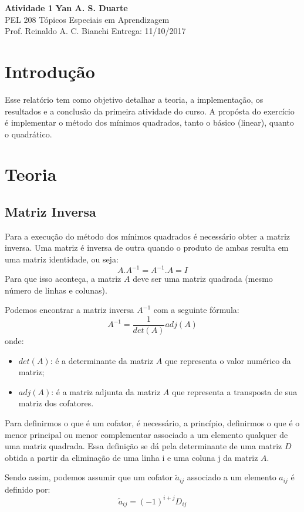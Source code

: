 \documentclass[a4paper, 11pt]{article}
\begin{document}
\noindent
\large\textbf{Atividade 1} \hfill \textbf{Yan A. S. Duarte} \\
\normalsize PEL 208 \hfill Tópicos Especiais em Aprendizagem \\
Prof. Reinaldo A. C. Bianchi \hfill Entrega: 11/10/2017 \\


\section*{Introdução}

Esse relatório tem como objetivo detalhar a teoria, a implementação, os resultados e a conclusão da primeira atividade do curso. A propósta do exercício é implementar o método dos mínimos quadrados, tanto o básico (linear), quanto o quadrático.

\section*{Teoria}
\subsection*{Matriz Inversa}
Para a execução do método dos mínimos quadrados é necessário obter a matriz inversa.
Uma matriz é inversa de outra quando o produto de ambas resulta em uma matriz identidade, ou seja:
$$ A.A^{-1} = A^{-1}.A = I $$
Para que isso aconteça, a matriz $ A $ deve ser uma matriz quadrada (mesmo número de linhas e colunas).

Podemos encontrar a matriz inversa $ A^{-1} $ com a seguinte fórmula:
$$ A^{-1} = \frac{1}{det(A)} adj(A) $$
onde:
\begin{itemize}
\item $ det(A) $: é a determinante da matriz $ A $ que representa o valor numérico da matriz;
\item $ adj(A) $: é a matriz adjunta da matriz $ A $ que representa a transposta de sua matriz dos cofatores.
\end{itemize}

Para definirmos o que é um cofator, é necessário, a princípio, definirmos o que é o menor principal ou menor complementar associado a um elemento qualquer de uma matriz quadrada.
Essa definição se dá pela determinante de uma matriz $ D $ obtida a partir da eliminação de uma linha i e uma coluna j da matriz $ A $.

Sendo assim, podemos assumir que um cofator $ \tilde{a}_{ij} $ associado a um elemento $ a_{ij} $ é definido por:
$$ \tilde{a}_{ij} = (-1)^{i+j} D_ {ij} $$
\end{document}
